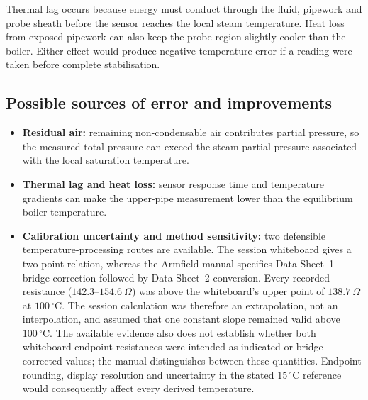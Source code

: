 \documentclass[11pt,a4paper]{article}
\begin{document}
Thermal lag occurs because energy must conduct through the fluid, pipework and
probe sheath before the sensor reaches the local steam temperature. Heat loss
from exposed pipework can also keep the probe region slightly cooler than the
boiler. Either effect would produce negative temperature error if a reading were
taken before complete stabilisation.

\subsection{Possible sources of error and improvements}
\begin{itemize}
  \item \textbf{Residual air:} remaining non-condensable air contributes partial
        pressure, so the measured total pressure can exceed the steam partial
        pressure associated with the local saturation temperature.
  \item \textbf{Thermal lag and heat loss:} sensor response time and temperature
        gradients can make the upper-pipe measurement lower than the equilibrium
        boiler temperature.
  \newpage
  \item \textbf{Calibration uncertainty and method sensitivity:} two defensible
        temperature-processing routes are available. The session whiteboard gives
        a two-point relation, whereas the Armfield manual specifies Data Sheet~1
        bridge correction followed by Data Sheet~2 conversion. Every recorded
        resistance ($142.3$--$154.6~\Omega$) was above the whiteboard's upper point
        of $138.7~\Omega$ at $100\,{}^\circ\mathrm{C}$. The session calculation was
        therefore an extrapolation, not an interpolation, and assumed that one
        constant slope remained valid above $100\,{}^\circ\mathrm{C}$. The available
        evidence also does not establish whether both whiteboard endpoint
        resistances were intended as indicated or bridge-corrected values; the
        manual distinguishes between these quantities. Endpoint rounding, display
        resolution and uncertainty in the stated $15\,{}^\circ\mathrm{C}$ reference
        would consequently affect every derived temperature.


\end{itemize}
\end{document}

